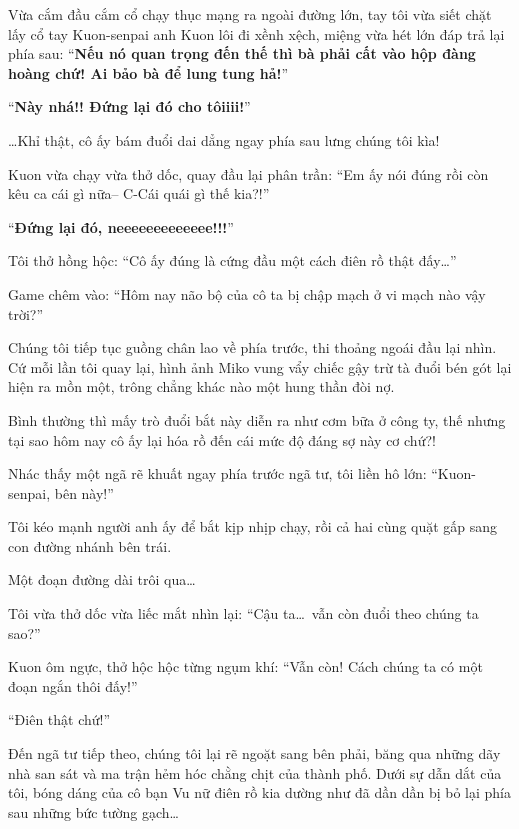 \documentclass[../main.tex]{subfiles}
\begin{document}
\ct

Vừa cắm đầu cắm cổ chạy thục mạng ra ngoài đường lớn, tay tôi vừa siết chặt lấy cổ tay Kuon-senpai anh Kuon lôi đi xềnh xệch, miệng vừa hét lớn đáp trả lại phía sau: ``\textbf{Nếu nó quan trọng đến thế thì bà phải cất vào hộp đàng hoàng chứ! Ai bảo bà để lung tung hả!}''


``\textbf{Này nhá!! Đứng lại đó cho tôiiii!}''

\dots Khỉ thật, cô ấy bám đuổi dai dẳng ngay phía sau lưng chúng tôi kìa!

Kuon vừa chạy vừa thở dốc, quay đầu lại phân trần: ``Em ấy nói đúng rồi còn kêu ca cái gì nữa-- C-Cái quái gì thế kia?!''

``\textbf{Đứng lại đó, neeeeeeeeeeeee!!!}''

Tôi thở hồng hộc: ``Cô ấy đúng là cứng đầu một cách điên rồ thật đấy\dots''

Game chêm vào: ``Hôm nay não bộ của cô ta bị chập mạch ở vi mạch nào vậy trời?''

Chúng tôi tiếp tục guồng chân lao về phía trước, thi thoảng ngoái đầu lại nhìn. Cứ mỗi lần tôi quay lại, hình ảnh Miko vung vẩy chiếc gậy trừ tà đuổi bén gót lại hiện ra mồn một, trông chẳng khác nào một hung thần đòi nợ.

Bình thường thì mấy trò đuổi bắt này diễn ra như cơm bữa ở công ty, thế nhưng tại sao hôm nay cô ấy lại hóa rồ đến cái mức độ đáng sợ này cơ chứ?!

Nhác thấy một ngã rẽ khuất ngay phía trước ngã tư, tôi liền hô lớn: ``Kuon-senpai, bên này!''

Tôi kéo mạnh người anh ấy để bắt kịp nhịp chạy, rồi cả hai cùng quặt gấp sang con đường nhánh bên trái.


Một đoạn đường dài trôi qua\dots

Tôi vừa thở dốc vừa liếc mắt nhìn lại: ``Cậu ta\dots\ vẫn còn đuổi theo chúng ta sao?''

Kuon ôm ngực, thở hộc hộc từng ngụm khí: ``Vẫn còn! Cách chúng ta có một đoạn ngắn thôi đấy!''

``Điên thật chứ!''

Đến ngã tư tiếp theo, chúng tôi lại rẽ ngoặt sang bên phải, băng qua những dãy nhà san sát và ma trận hẻm hóc chằng chịt của thành phố. Dưới sự dẫn dắt của tôi, bóng dáng của cô bạn Vu nữ điên rồ kia dường như đã dần dần bị bỏ lại phía sau những bức tường gạch\dots

\end{document}
